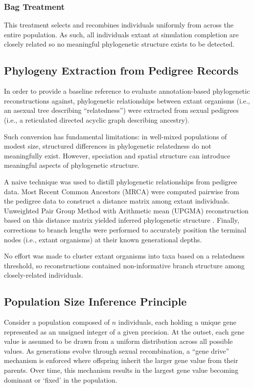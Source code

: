 \subsubsection{Bag Treatment}

This treatment selects and recombines individuals uniformly from across the entire population.
As such, all individuals extant at simulation completion are closely related so no meaningful phylogenetic structure exists to be detected.

\subsection{Phylogeny Extraction from Pedigree Records}
\label{sec:phylogeny-extraction}

In order to provide a baseline reference to evaluate annotation-based phylogenetic reconstructions against, phylogenetic relationships between extant organisms (i.e., an asexual tree describing ``relatedness'') were extracted from sexual pedigrees (i.e., a reticulated directed acyclic graph describing ancestry).

Such conversion has fundamental limitations: in well-mixed populations of modest size, structured differences in phylogenetic relatedness do not meaningfully exist.
However, speciation and spatial structure can introduce meaningful aspects of phylogenetic structure.

A naive technique was used to distill phylogenetic relationships from pedigree data.
Most Recent Common Ancestors (MRCA) were computed pairwise from the pedigree data to construct a distance matrix among extant individuals.
Unweighted Pair Group Method with Arithmetic mean (UPGMA) reconstruction based on this distance matrix yielded inferred phylogenetic structure \citep{sokal1958university}.
Finally, corrections to branch lengths were performed to accurately position the terminal nodes (i.e., extant organisms) at their known generational depths.

No effort was made to cluster extant organisms into taxa based on a relatedness threshold, so reconstructions contained non-informative branch structure among closely-related individuals.

\subsection{Population Size Inference Principle}
\label{sec:population-size-inference-principle}

Consider a population composed of $n$ individuals, each holding a unique gene represented as an unsigned integer of a given precision.
At the outset, each gene value is assumed to be drawn from a uniform distribution across all possible values.
As generations evolve through sexual recombination, a ``gene drive'' mechanism is enforced where offspring inherit the larger gene value from their parents.
Over time, this mechanism results in the largest gene value becoming dominant or `fixed' in the population.

